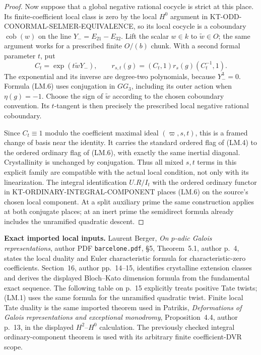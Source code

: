 \documentclass[11pt,a4paper]{article}
\theoremstyle{definition}
\renewcommand{\paragraph}[1]{\par\smallskip\noindent\textbf{#1}\quad\ignorespaces}
\begin{document}
\begin{proof}
Now suppose that a global negative rational cocycle
is strict at this place.  Its finite-coefficient
local class is zero by the local $H^0$ argument in
KT-ODD-CONORMAL-SELMER-EQUIVALENCE, so its local
cocycle is a coboundary $\operatorname{cob}(w)$
on the line $Y_-=E_{21}-E_{32}$.  Lift the scalar
$w\in k$ to $\widetilde w\in O$; the same argument
works for a prescribed finite $O/(b)$ chunk.
With a second formal parameter $t$, put
\[
 C_t=\exp(t\widetilde wY_-),\qquad
 r_{s,t}(g)=(C_t,1)r_s(g)(C_t^{-1},1).                    \tag{LM.6}
\]
The exponential and its inverse are degree-two
polynomials, because $Y_-^3=0$.  Formula (LM.6)
uses conjugation in $GG_3$, including its outer
action when $\eta(g)=-1$.  Choose the sign of
$\widetilde w$ according to the chosen coboundary
convention.  Its $t$-tangent is then precisely the
prescribed local negative rational coboundary.

Since $C_t\equiv1$ modulo the coefficient maximal
ideal $(\varpi,s,t)$, this is a framed change of
basis near the identity.  It carries the standard
ordered flag of (LM.4) to the ordered ordinary flag
of (LM.6), with exactly the same inertial diagonal.
Crystallinity is unchanged by conjugation.  Thus all
mixed $s,t$ terms in this explicit family are
compatible with the actual local condition, not
only with its linearization.  The integral
identification $U.R/I_t$ with the ordered ordinary
functor in KT-ORDINARY-INTEGRAL-COMPONENT places
(LM.6) on the source's chosen local component.
At a split auxiliary prime the same construction
applies at both conjugate places; at an inert prime
the semidirect formula already includes the
unramified quadratic descent.
\end{proof}

\paragraph{Exact imported local inputs.}
Laurent Berger, \emph{On $p$-adic Galois representations},
author PDF \texttt{barcelone.pdf}, \S5, Theorem~5.1,
author p.~4, states the local duality and Euler
characteristic formula for characteristic-zero
coefficients.  Section~16, author pp.~14--15,
identifies crystalline extension classes and derives
the displayed Bloch--Kato dimension formula from
the fundamental exact sequence.  The following
table on p.~15 explicitly treats positive Tate
twists; (LM.1) uses the same formula for the
unramified quadratic twist.  Finite local Tate
duality is the same imported theorem used in
Patrikis, \emph{Deformations of Galois
representations and exceptional monodromy},
Proposition~4.4, author p.~13, in the displayed
$H^2$--$H^0$ calculation.  The previously checked
integral ordinary-component theorem is used with
its arbitrary finite coefficient-DVR scope.
\end{document}
